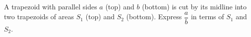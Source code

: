 A trapezoid with parallel sides $a$ (top) and $b$ (bottom) is cut by its midline into two trapezoids of areas $S_1$ (top) and $S_2$ (bottom). Express $\dfrac ab$ in terms of $S_1$ and $S_2$.
